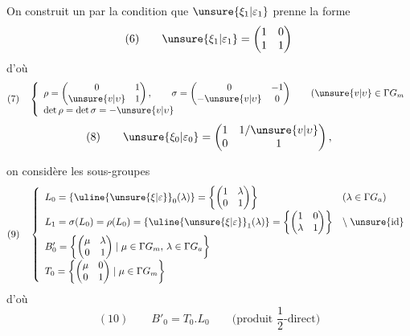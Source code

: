 On construit un 
par la condition que $\unsure{\xi_1|\varepsilon_1}$ prenne la forme
\[
(6)\qquad\unsure{\xi_1|\varepsilon_1}
 =\begin{pmatrix}1&0\\1&1\end{pmatrix}
\]
d'où
\[
(7)\quad\left\{\begin{array}{l}
\displaystyle\rho=\begin{pmatrix}0&1\\\unsure{v|\upsilon}&1\end{pmatrix},\qquad
 \sigma=\begin{pmatrix}0&-1\\-\unsure{v|\upsilon}&0\end{pmatrix}
 \qquad(\unsure{v|\upsilon}\in\Gamma G_m\\[6pt]
\det\rho=\det\sigma=-\unsure{v|\upsilon}
\end{array}\right.
\]
\[
(8)\qquad\unsure{\xi_0|\varepsilon_0}
 =\begin{pmatrix}1&1/\unsure{v|\upsilon}\\0&1\end{pmatrix},
\]



on considère les sous-groupes
\[
(9)\quad\left\{\begin{array}{ll}
 L_0=\{\uline{\unsure{\xi|\varepsilon}}_0(\lambda)\}
   =\left\{\begin{pmatrix}1&\lambda\\0&1\end{pmatrix}\right\}
 & (\lambda\in\Gamma G_a)\\[7pt]
 L_1=\sigma(L_0)=\rho(L_0)
   =\{\uline{\unsure{\xi|\varepsilon}}_1(\lambda)\}
   =\left\{\begin{pmatrix}1&0\\\lambda&1\end{pmatrix}\right\}
 & \backslash\;\unsure{\text{id}}\\[7pt]
 B'_0=\left\{\begin{pmatrix}\mu&\lambda\\0&1\end{pmatrix}
       \mid\mu\in\Gamma G_m,\,\lambda\in\Gamma G_a\right\} &\\[7pt]
 T_0=\left\{\begin{pmatrix}\mu&0\\0&1\end{pmatrix}
       \mid\mu\in\Gamma G_m\right\} &
\end{array}\right.
\]
d'où
\[
(10)\qquad B'_0=T_0.L_0\qquad\text{(produit $\frac12$-direct)}
\]
\margin{\unsure{---}}

